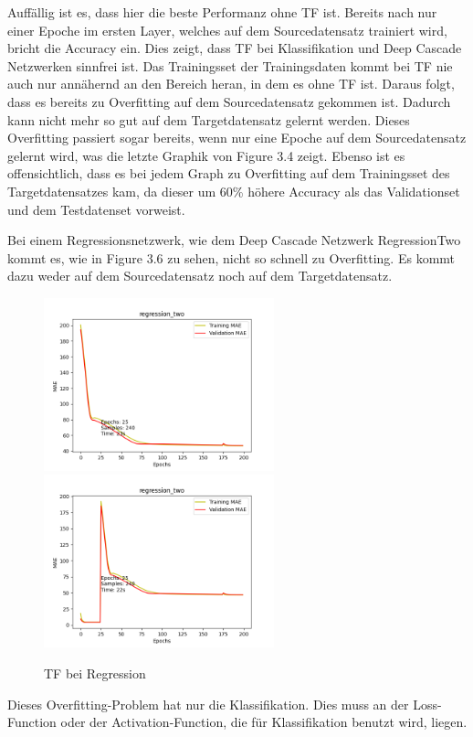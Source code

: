 Auffällig ist es, dass hier die beste Performanz ohne TF ist. Bereits nach nur einer Epoche im ersten Layer, welches auf dem Sourcedatensatz 
trainiert wird, bricht die Accuracy ein. Dies zeigt, dass TF bei Klassifikation und Deep Cascade Netzwerken sinnfrei ist. Das 
Trainingsset der Trainingsdaten kommt bei TF nie auch nur annähernd an den Bereich heran, in dem es ohne TF ist. Daraus folgt, dass es 
bereits zu Overfitting auf dem Sourcedatensatz gekommen ist. Dadurch kann nicht mehr so gut auf dem Targetdatensatz gelernt werden. Dieses 
Overfitting passiert sogar bereits, wenn nur eine Epoche auf dem Sourcedatensatz gelernt wird, was die letzte Graphik von Figure 3.4 zeigt. 
Ebenso ist es offensichtlich, dass es bei jedem Graph zu Overfitting auf dem Trainingsset des Targetdatensatzes kam, da dieser um 60\% höhere 
Accuracy als das Validationset und dem Testdatenset vorweist. 

Bei einem Regressionsnetzwerk, wie dem Deep Cascade Netzwerk RegressionTwo kommt es, wie in Figure 3.6 zu sehen, nicht so schnell zu Overfitting. 
Es kommt dazu weder auf dem Sourcedatensatz noch auf dem Targetdatensatz. 

\begin{figure}[htpb]
    \includegraphics[height=5cm]{../../Plots/ba_plots/regr2/woregr2tr.png}
    \includegraphics[height=5cm]{../../Plots/ba_plots/regr2/1TFtr.png}
    \caption{\label{fig:regr2tf} TF bei Regression}
\end{figure}

Dieses Overfitting-Problem hat nur die Klassifikation. Dies muss an der Loss-Function oder der Activation-Function, die für Klassifikation 
benutzt wird, liegen. 

